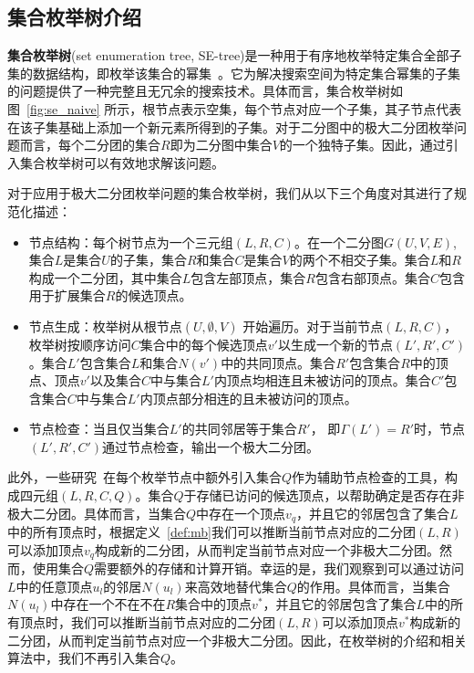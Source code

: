 
\subsection{集合枚举树介绍}
\label{subsec:se}


\textbf{集合枚举树}(set enumeration tree, SE-tree)是一种用于有序地枚举特定集合全部子集的数据结构，即枚举该集合的幂集~\cite{SEtree92}。它为解决搜索空间为特定集合幂集的子集的问题提供了一种完整且无冗余的搜索技术。具体而言，集合枚举树如图~\ref{fig:se_naive} 所示，根节点表示空集，每个节点对应一个子集，其子节点代表在该子集基础上添加一个新元素所得到的子集。对于二分图中的极大二分团枚举问题而言，每个二分团的集合$R$即为二分图中集合$V$的一个独特子集。因此，通过引入集合枚举树可以有效地求解该问题。

对于应用于极大二分团枚举问题的集合枚举树，我们从以下三个角度对其进行了规范化描述：

\begin{itemize}
  \item 节点结构：每个树节点为一个三元组$(L,R,C)$。在一个二分图$G(U,V,E)$,集合$L$是集合$U$的子集，集合$R$和集合$C$是集合$V$的两个不相交子集。集合$L$和$R$构成一个二分团，其中集合$L$包含左部顶点，集合$R$包含右部顶点。集合$C$包含用于扩展集合$R$的候选顶点。
  \item 节点生成：枚举树从根节点$(U,\emptyset,V)$ 开始遍历。对于当前节点$(L,R,C)$，枚举树按顺序访问$C$集合中的每个候选顶点$v'$以生成一个新的节点$(L',R',C')$。集合$L'$包含集合$L$和集合$N(v')$中的共同顶点。集合$R'$包含集合$R$中的顶点、顶点$v'$以及集合$C$中与集合$L'$内顶点均相连且未被访问的顶点。集合$C'$包含集合$C$中与集合$L'$内顶点部分相连的且未被访问的顶点。
  \item 节点检查：当且仅当集合$L'$的共同邻居等于集合$R'$， 即$\Gamma(L')=R'$时，节点$(L',R',C')$通过节点检查，输出一个极大二分团。
\end{itemize}

此外，一些研究~\cite{iMBEA14,ooMBE22}在每个枚举节点中额外引入集合$Q$作为辅助节点检查的工具，构成四元组$(L,R,C,Q)$。集合$Q$于存储已访问的候选顶点，以帮助确定是否存在非极大二分团。具体而言，当集合$Q$中存在一个顶点$v_q$，并且它的邻居包含了集合$L$中的所有顶点时，根据定义~\ref{def:mb}我们可以推断当前节点对应的二分团$(L,R)$可以添加顶点$v_q$构成新的二分团，从而判定当前节点对应一个非极大二分团。然而，使用集合$Q$需要额外的存储和计算开销。幸运的是，我们观察到可以通过访问$L$中的任意顶点$u_l$的邻居$N(u_l)$来高效地替代集合$Q$的作用。具体而言，当集合$N(u_l)$中存在一个不在不在$R$集合中的顶点$v^*$，并且它的邻居包含了集合$L$中的所有顶点时，我们可以推断当前节点对应的二分团$(L,R)$可以添加顶点$v^*$构成新的二分团，从而判定当前节点对应一个非极大二分团。因此，在枚举树的介绍和相关算法中，我们不再引入集合$Q$。

